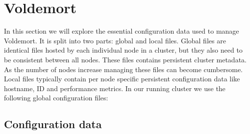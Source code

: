 \section{Voldemort}
\label{sec:voldemort}
In this section we will explore the essential configuration data used to manage Voldemort. It is split into two parts: global and local files. Global files are identical files hosted by each individual node in a cluster, but they also need to be consistent between all nodes. These files contains persistent cluster metadata. As the number of nodes increase managing these files can become cumbersome. Local files typically contain per node specific persistent configuration data like hostname, ID and performance metrics. In our running cluster we use the following global configuration files:

\subsection{Configuration data}

